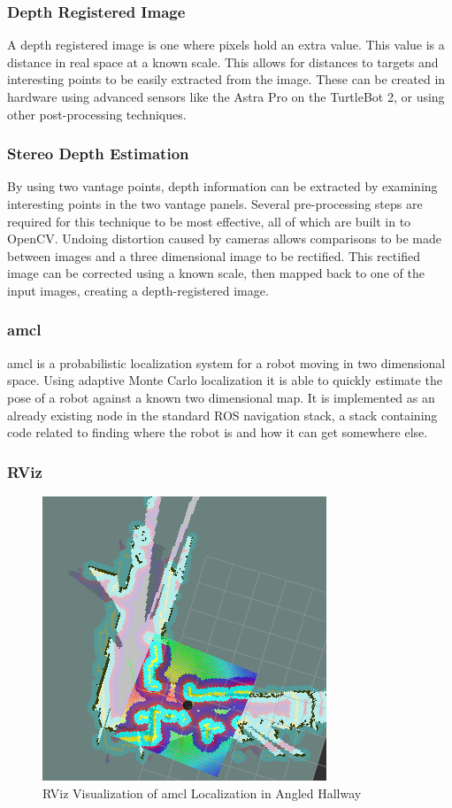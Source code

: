 \documentclass{article}[12]
\begin{document}
		\subsubsection{Depth Registered Image}

A depth registered image is one where pixels hold an extra value. This value is a distance in real space at a known scale. This allows for distances to targets and interesting points to be easily extracted from the image. These can be created in hardware using advanced sensors like the Astra Pro on the TurtleBot 2, or using other post-processing techniques.
		
		\subsubsection{Stereo Depth Estimation}
		
		By using two vantage points, depth information can be extracted by examining interesting points in the two vantage panels. Several pre-processing steps are required for this technique to be most effective, all of which are built in to OpenCV. Undoing distortion caused by cameras allows comparisons to be made between images and a three dimensional image to be rectified. This rectified image can be corrected using a known scale, then mapped back to one of the input images, creating a depth-registered image.
		
		\subsubsection{amcl}
		
		amcl is a probabilistic localization system for a robot moving in two dimensional space. Using adaptive Monte Carlo localization \cite{doucet_freitas_gordon_2001} it is able to quickly estimate the pose of a robot against a known two dimensional map. It is implemented as an already existing node in the standard ROS navigation stack, a stack containing code related to finding where the robot is and how it can get somewhere else.
		
		\subsubsection{RViz}
		
		\begin{figure}[]
			\centering
			\includegraphics[width=0.5\linewidth]{rviz_screenshot}
			\caption{RViz Visualization of amcl Localization in Angled Hallway}
			\label{fig:rviz}
		\end{figure}
		
\end{document}
